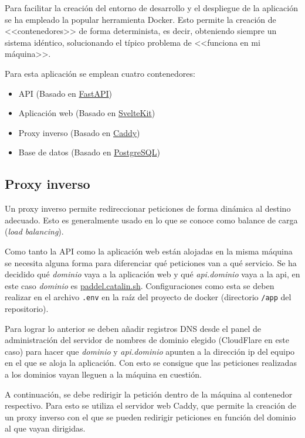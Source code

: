 Para facilitar la creación del entorno de desarrollo y el despliegue de la
aplicación se ha empleado la popular herramienta Docker. Esto permite la
creación de <<contenedores>> de forma determinista, es decir, obteniendo siempre
un sistema idéntico, solucionando el típico problema de <<funciona en mi
máquina>>.

Para esta aplicación se emplean cuatro contenedores:

\begin{itemize}
    \item API (Basado en \href{https://fastapi.tiangolo.com/}{FastAPI})
    \item Aplicación web (Basado en \href{https://kit.svelte.dev/}{SvelteKit})
    \item Proxy inverso (Basado en \href{https://caddyserver.com/}{Caddy})
    \item Base de datos (Basado en \href{https://www.postgresql.org/}{PostgreSQL})
\end{itemize}

\subsection{Proxy inverso}

Un proxy inverso permite redireccionar peticiones de forma dinámica al destino
adecuado. Esto es generalmente usado en lo que se conoce como balance de carga
(\textit{load balancing}).

Como tanto la API como la aplicación web están alojadas en la misma máquina se
necesita alguna forma para diferenciar qué peticiones van a qué servicio. Se ha
decidido qué \textit{dominio} vaya a la aplicación web y qué
\textit{api.dominio} vaya a la api, en este caso \textit{dominio} es
\href{https://paddel.catalin.sh}{paddel.catalin.sh}. Configuraciones como esta
se deben realizar en el archivo \texttt{.env} en la raíz del proyecto de docker
(directorio \texttt{/app} del repositorio).

Para lograr lo anterior se deben añadir registros DNS desde el panel de
administración del servidor de nombres de dominio elegido (CloudFlare en este
caso) para hacer que \textit{dominio} y \textit{api.dominio} apunten a la
dirección ip del equipo en el que se aloja la aplicación. Con esto se consigue
que las peticiones realizadas a los dominios vayan lleguen a la máquina en
cuestión.

A continuación, se debe redirigir la petición dentro de la máquina al contenedor
respectivo. Para esto se utiliza el servidor web Caddy, que permite la creación
de un proxy inverso con el que se pueden redirigir peticiones en función del
dominio al que vayan dirigidas.

